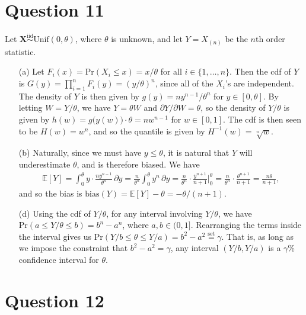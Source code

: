 \documentclass[10pt]{article}
\begin{document}
\section{Question 11} \noindent
Let \(\bm{X} \overset{\mathrm{iid}}{\sim} \mathrm{Unif}(0, \theta)\), where \(\theta\) is unknown, and let \(Y = X_{(n)}\) be the \(n\)th order statistic. 
\begin{itemize}
    \item[(a)] Let \(F_i(x) = \mathrm{Pr}(X_i \le x) = x / \theta\) for all \(i \in \{1, \ldots, n\}\). Then the cdf of \(Y\) is 
    \(G(y) = \prod_{i = 1}^n F_i(y) = \left( y / \theta \right)^n\), since all of the \(X_i\)'s are independent. The density of \(Y\) is then given by 
    \(g(y) = n y^{n - 1} / \theta^n\) for \(y \in [0, \theta]\). By letting \(W = Y / \theta\), we have \(Y = \theta W\) and \(\partial Y / \partial W = \theta\), 
    so the density of \(Y / \theta\) is given by \(h(w) = g\big( y(w) \big) \cdot \theta = n w^{n-1}\) for \(w \in [0,1]\). The cdf is then seen to be 
    \(H(w) = w^n\), and so the quantile is given by \(H^{-1}(w) = \sqrt[n]{w}\).
    \item[(b)] Naturally, since we must have \(y \le \theta\), it is natural that \(Y\) will underestimate \(\theta\), and is therefore biased. We have 
    \begin{align*}
        \mathbb{E}[Y]
        = \int_{0}^{\theta} y \cdot \frac{n y^{n-1}}{\theta^n} \,\partial y
        = \frac{n}{\theta^n} \int_0^{\theta} y^n \,\partial y
        = \frac{n}{\theta^n} \cdot \frac{y^{n+1}}{n+1} \bigg|_{0}^{\theta}
        = \frac{n}{\theta^n} \cdot \frac{\theta^{n+1}}{n+1}
        = \frac{n\theta}{n+1},
    \end{align*}
    and so the bias is \(\mathrm{bias}(Y) = \mathbb{E}[Y] - \theta = -\theta / (n+1)\). 
    \item[(d)] Using the cdf of \(Y / \theta\), for any interval involving \(Y / \theta\), we have \(\mathrm{Pr}(a \le Y / \theta \le b) = b^n - a^n\), where 
    \(a, b \in (0, 1]\). Rearranging the terms inside the interval gives us \(\mathrm{Pr}(Y / b \le \theta \le Y / a) = b^2 - a^2 \overset{\mathrm{set}}{=} \gamma\).
    That is, as long as we impose the constraint that \(b^2 - a^2 = \gamma\), any interval \((Y/b, Y/a)\) is a \(\gamma\)\%{} confidence interval for \(\theta\). 
\end{itemize}

\section{Question 12} \noindent
\end{document}
